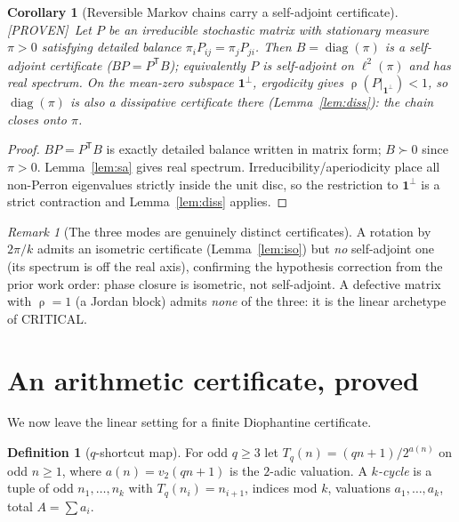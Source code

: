 \documentclass[11pt]{article}
\theoremstyle{definition}
\newtheorem{definition}{Definition}
\theoremstyle{plain}
\newtheorem{corollary}{Corollary}
\theoremstyle{remark}
\newtheorem*{remark}{Remark}
\newcommand{\PROVEN}{\textcolor{green!45!black}{\textsf{[PROVEN]}}}
\newcommand{\T}{\mathsf{T}}
\newcommand{\trp}{^{\!\T}}
\DeclareMathOperator{\spr}{\rho}
\begin{document}
\begin{corollary}[Reversible Markov chains carry a self-adjoint certificate]\label{cor:markov}
\PROVEN\ Let $P$ be an irreducible stochastic matrix with stationary measure $\pi>0$
satisfying detailed balance $\pi_iP_{ij}=\pi_jP_{ji}$. Then $B=\operatorname{diag}(\pi)$
is a self-adjoint certificate ($BP=P\trp B$); equivalently $P$ is self-adjoint on
$\ell^2(\pi)$ and has real spectrum. On the mean-zero subspace $\mathbf1^\perp$, ergodicity
gives $\spr(P|_{\mathbf 1^\perp})<1$, so $\operatorname{diag}(\pi)$ is \emph{also} a
dissipative certificate there (Lemma~\ref{lem:diss}): the chain closes onto $\pi$.
\end{corollary}
\begin{proof}
$BP=P\trp B$ is exactly detailed balance written in matrix form; $B\succ0$ since
$\pi>0$. Lemma~\ref{lem:sa} gives real spectrum. Irreducibility/aperiodicity place all
non-Perron eigenvalues strictly inside the unit disc, so the restriction to
$\mathbf 1^\perp$ is a strict contraction and Lemma~\ref{lem:diss} applies.
\end{proof}

\begin{remark}[The three modes are genuinely distinct certificates]
A rotation by $2\pi/k$ admits an isometric certificate (Lemma~\ref{lem:iso}) but
\emph{no} self-adjoint one (its spectrum is off the real axis), confirming the
hypothesis correction from the prior work order: phase closure is isometric, not
self-adjoint. A defective matrix with $\spr=1$ (a Jordan block) admits \emph{none} of
the three: it is the linear archetype of \textsf{CRITICAL}.
\end{remark}

\section{An arithmetic certificate, proved}

We now leave the linear setting for a finite Diophantine certificate.

\begin{definition}[$q$-shortcut map]
For odd $q\ge3$ let $T_q(n)=(qn+1)/2^{a(n)}$ on odd $n\ge1$, where
$a(n)=v_2(qn+1)$ is the $2$-adic valuation. A \emph{$k$-cycle} is a tuple of odd
$n_1,\dots,n_k$ with $T_q(n_i)=n_{i+1}$, indices mod $k$, valuations $a_1,\dots,a_k$,
total $A=\sum a_i$.
\end{definition}
\end{document}
